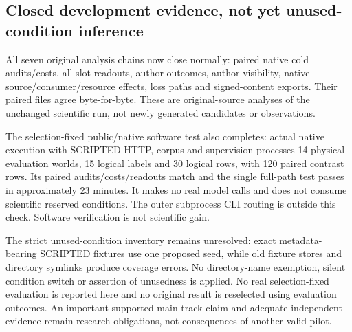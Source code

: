 \subsection{Closed development evidence, not yet unused-condition inference}
All seven original analysis chains now close normally: paired native cold
audits/costs, all-slot readouts, author outcomes, author visibility, native
source/consumer/resource effects, loss paths and signed-content exports.
Their paired files agree byte-for-byte. These are original-source analyses of
the unchanged scientific run, not newly generated candidates or observations.

The selection-fixed public/native software test also completes: actual native
execution with SCRIPTED HTTP, corpus and supervision processes 14 physical
evaluation worlds, 15 logical labels and 30 logical rows, with 120 paired
contrast rows. Its paired audits/costs/readouts match and the single full-path
test passes in approximately 23 minutes. It makes no real model calls and
does not consume scientific reserved conditions. The outer subprocess CLI
routing is outside this check. Software verification is not scientific gain.

The strict unused-condition inventory remains unresolved: exact metadata-bearing
SCRIPTED fixtures use one proposed seed, while old fixture stores and directory
symlinks produce coverage errors. No directory-name exemption, silent condition
switch or assertion of unusedness is applied. No real selection-fixed evaluation
is reported here and no original result is reselected using evaluation outcomes.
An important supported main-track claim and adequate independent evidence remain
research obligations, not consequences of another valid pilot.
